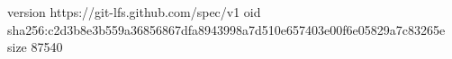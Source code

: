 version https://git-lfs.github.com/spec/v1
oid sha256:c2d3b8e3b559a36856867dfa8943998a7d510e657403e00f6e05829a7c83265e
size 87540
